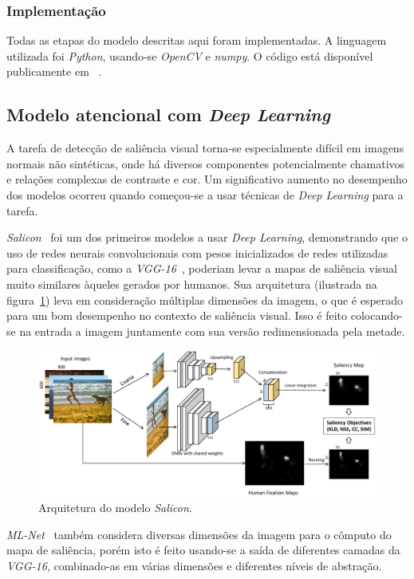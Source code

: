 \documentclass[11pt]{article}
\newcommand{\tit}[1]{\textit{#1}}
\begin{document}
\subsubsection{Implementação}
Todas as etapas do modelo descritas aqui foram implementadas.
A linguagem utilizada foi \tit{Python}, usando-se \tit{OpenCV} e \tit{numpy}.
O código está disponível publicamente em ~\cite{att}.

\subsection{Modelo atencional com \tit{Deep Learning}}
A tarefa de detecção de saliência visual torna-se especialmente difícil em
imagens normais não sintéticas, onde há diversos componentes potencialmente
chamativos e relações complexas de contraste e cor.
Um significativo aumento no desempenho dos modelos ocorreu quando começou-se
a usar técnicas de \tit{Deep Learning} para a tarefa.

\emph{Salicon}~\cite{jiang_2015} foi um dos primeiros modelos a usar
\tit{Deep Learning}, demonstrando que o uso de redes neurais convolucionais com
pesos inicializados de redes utilizadas para classificação, como a
\emph{VGG-16}~\cite{zisserman_2014},
poderiam levar a mapas de saliência visual muito similares àqueles
gerados por humanos.
Sua arquitetura (ilustrada na figura~\ref{fig:salicon})
leva em consideração múltiplas dimensões da imagem, o que é
esperado para um bom desempenho no contexto de saliência visual.
Isso é feito colocando-se na entrada a imagem juntamente com sua versão
redimensionada pela metade.
\begin{figure}[H]
\begin{center}
        \includegraphics[width=0.9\linewidth]{img/salicon.png}
\end{center}
\caption{Arquitetura do modelo \tit{Salicon}.}
\label{fig:salicon}
\end{figure}

\emph{ML-Net}~\cite{cornia_2016} também considera diversas dimensões da
imagem para o cômputo do mapa de saliência, porém isto é feito
usando-se a saída de diferentes camadas da
\emph{VGG-16}, combinado-as em várias dimensões e diferentes níveis de
abstração.
\end{document}
